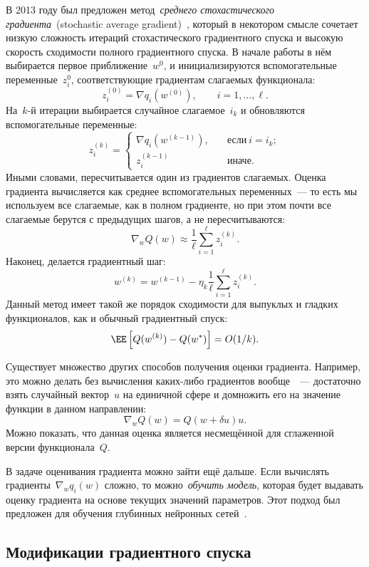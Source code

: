 \documentclass[12pt,fleqn]{article}
\begin{document}
В 2013 году был предложен метод~\emph{среднего стохастического градиента}~(stochastic average gradient)~\cite{schmidt13sag},
который в некотором смысле сочетает низкую сложность итераций стохастического градиентного спуска
и высокую скорость сходимости полного градиентного спуска.
В начале работы в нём выбирается первое приближение~$w^0$,
и инициализируются вспомогательные переменные~$z_i^0$,
соответствующие градиентам слагаемых функционала:
\[
    z_i^{(0)}
    =
    \nabla q_i(w^{(0)}),
    \qquad
    i = 1, \dots, \ell.
\]
На~$k$-й итерации выбирается случайное слагаемое~$i_k$ и
обновляются вспомогательные переменные:
\[
    z_i^{(k)}
    =
    \begin{cases}
        \nabla q_i(w^{(k - 1)}),
        \quad
        &\text{если}\ i = i_k;\\
        z_i^{(k - 1)}
        \quad
        &\text{иначе}.
    \end{cases}
\]
Иными словами, пересчитывается один из градиентов слагаемых.
Оценка градиента вычисляется как среднее вспомогательных переменных~---
то есть мы используем все слагаемые, как в полном градиенте,
но при этом почти все слагаемые берутся с предыдущих шагов, а не пересчитываются:
\[
    \nabla_w Q(w)
    \approx
    \frac{1}{\ell}
    \sum_{i = 1}^{\ell}
        z_i^{(k)}.
\]
Наконец, делается градиентный шаг:
\[
    w^{(k)}
    =
    w^{(k - 1)}
    -
    \eta_k
    \frac{1}{\ell}
    \sum_{i = 1}^{\ell}
    z_i^{(k)}.
\]
Данный метод имеет такой же порядок сходимости для выпуклых и гладких функционалов,
как и обычный градиентный спуск:
\[
    \EE \left[
        Q(w^{(k)}) - Q(w^*)
    \right]
    =
    O(1 / k).
\]

Существует множество других способов получения оценки градиента.
Например, это можно делать без вычисления каких-либо градиентов вообще~\cite{flaxman05without}~---
достаточно взять случайный вектор~$u$ на единичной сфере и домножить его
на значение функции в данном направлении:
\[
    \nabla_w Q(w)
    =
    Q(w + \delta u) u.
\]
Можно показать, что данная оценка является несмещённой для сглаженной версии функционала~$Q$.

В задаче оценивания градиента можно зайти ещё дальше.
Если вычислять градиенты~$\nabla_w q_i(w)$ сложно,
то можно~\emph{обучить модель}, которая будет выдавать оценку градиента на основе текущих значений параметров.
Этот подход был предложен для обучения глубинных нейронных сетей~\cite{jaderberg16synthetic}.

\subsection{Модификации градиентного спуска}
\end{document}

